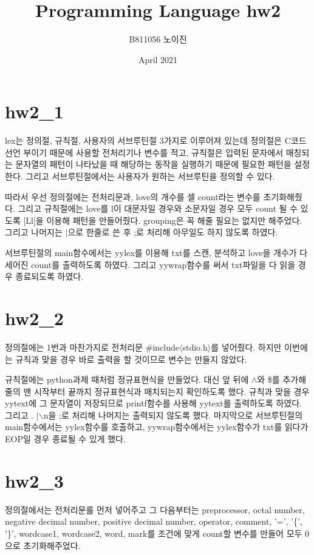 \documentclass{article}
\title{Programming Language hw2}
\author{B811056 노이진}
\date{April 2021}
\begin{document}
\maketitle

\section{hw2\_1}
lex는 정의절, 규칙절, 사용자의 서브루틴절 3가지로 이루어져 있는데 정의절은 C코드 선언 부이기 때문에 사용할 전처리기나 변수를 적고, 규칙절은 입력된 문자에서 매칭되는 문자열의 패턴이 나타났을 때 해당하는 동작을 실행하기 때문에 필요한 패턴을 설정한다. 그리고 서브루틴절에서는 사용자가 원하는 서브루틴을 정의할 수 있다.

따라서 우선 정의절에는 전처리문과, love의 개수를 셀 count라는 변수를 초기화해줬다. 그리고 규칙절에는 love를 l이 대문자일 경우와 소문자일 경우 모두 count 될 수 있도록 [Ll]을 이용해 패턴을 만들어줬다. grouping은 꼭 해줄 필요는 없지만 해주었다. 그리고 나머지는 $\vert$으로 한줄로 쓴 후 ;로 처리해 아무일도 하지 않도록 하였다.

서브루틴절의 main함수에서는 yylex를 이용해 txt를 스캔, 분석하고 love을 개수가 다 세어진 count를 출력하도록 하였다.
그리고 yywrap함수를 써서 txt파일을 다 읽을 경우 종료되도록 하였다.

\section{hw2\_2}
정의절에는 1번과 마찬가지로 전처리문 \#include$\langle$stdio.h$\rangle$를 넣어줬다. 하지만 이번에는 규칙과 맞을 경우 바로 출력을 할 것이므로 변수는 만들지 않았다.

규칙절에는 python과제 때처럼 정규표현식을 만들었다. 대신 앞 뒤에 $\wedge$와 \$를 추가해 줄의 맨 시작부터 끝까지 정규표현식과 매치되는지 확인하도록 했다. 규칙과 맞을 경우 yytext에 그 문자열이 저장되므로 printf함수를 사용해 yytext를 출력하도록 하였다. 
그리고 . $\vert$$\backslash$n을 ;로 처리해 나머지는 출력되지 않도록 했다. 마지막으로 서브루틴절의 main함수에서는 yylex함수를 호출하고,
yywrap함수에서는 yylex함수가 txt를 읽다가 EOP일 경우 종료될 수 있게 했다.

\section{hw2\_3}
정의절에서는 전처리문를 먼저 넣어주고 그 다음부터는 preprocessor, octal number, negative decimal number, positive decimal number, operator, comment, '=', '\{', '\}', wordcase1, wordcase2, word, mark를 조건에 맞게 count할 변수를 만들어 모두 0으로 초기화해주었다.
\end{document}
